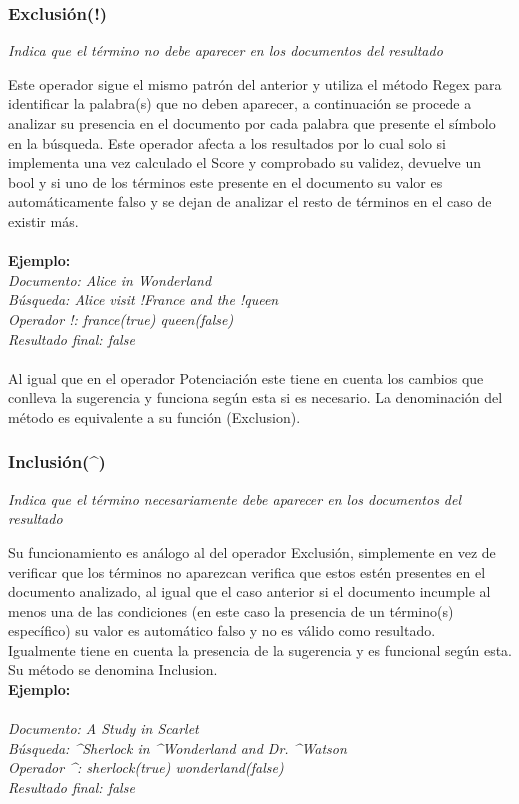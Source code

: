 \documentclass[options]{article}
\begin{document}
\subsubsection{Exclusión(!)}\label{exclusion}
\begin{center}
    \textit{Indica que el término no debe aparecer en los documentos del resultado}
\end{center}
Este operador sigue el mismo patrón del anterior y utiliza el método Regex para identificar la palabra(s) que no deben aparecer, a continuación se procede a analizar su presencia en el documento por cada palabra que presente el símbolo en la búsqueda. Este operador afecta a los resultados por lo cual solo si implementa una vez calculado el Score y comprobado su validez, devuelve un bool y  si uno de los términos este presente en el documento su valor es automáticamente falso y se dejan de analizar el resto de términos en el caso de existir más.\\
\\
\textbf{Ejemplo:}\\
\textit{Documento: Alice in Wonderland}\\
\textit{Búsqueda: Alice visit  !France and the !queen}\\
\textit{Operador !: france(true) queen(false)}\\
\textit{Resultado final: false}\\
\\
Al igual que en el operador Potenciación este tiene en cuenta los cambios que conlleva la sugerencia y funciona según esta si es necesario. La denominación del método es equivalente a su función (Exclusion).
\subsubsection{Inclusión(\textasciicircum)}\label{inclusion}
\begin{center}
    \textit{Indica que el término necesariamente debe aparecer en los documentos del resultado}
\end{center}
Su funcionamiento es análogo al del operador Exclusión, simplemente en vez de verificar que los términos no aparezcan verifica que estos estén presentes en el documento analizado, al igual que el caso anterior si el documento incumple al menos una de las condiciones (en este caso la presencia de un término(s) específico) su valor es automático falso y no es válido como resultado.\\
Igualmente tiene en cuenta la presencia de la sugerencia y es funcional según esta.\\
Su método se denomina Inclusion.\\
\textbf{Ejemplo:}\\
\\
\textit{Documento: A Study in Scarlet}\\
\textit{Búsqueda: \textasciicircum Sherlock in \textasciicircum Wonderland and Dr. \textasciicircum Watson}\\
\textit{Operador \textasciicircum : sherlock(true) wonderland(false)}\\
\textit{Resultado final: false}\\
\end{document}
